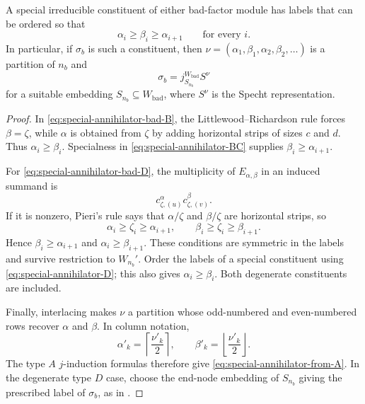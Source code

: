 \begin{lem}\label{lem:special-annihilator-interlacing}
A special irreducible constituent of either bad-factor module has
labels that can be ordered so that
\begin{equation}\label{eq:special-annihilator-strong}
  \alpha_i\geq\beta_i\geq\alpha_{i+1}\qquad\text{for every }i.
\end{equation}
In particular, if $\sigma_b$ is such a constituent, then
$\nu=(\alpha_1,\beta_1,\alpha_2,\beta_2,\ldots)$ is a partition of
$n_b$ and
\begin{equation}\label{eq:special-annihilator-from-A}
  \sigma_b=j_{S_{n_b}}^{W_{\mathrm{bad}}}S^\nu
\end{equation}
for a suitable embedding $S_{n_b}\subseteq W_{\mathrm{bad}}$,
where $S^\nu$ is the Specht representation.
\end{lem}

\begin{proof}
In \eqref{eq:special-annihilator-bad-B}, the Littlewood--Richardson rule
forces $\beta=\zeta$, while $\alpha$ is obtained from $\zeta$ by adding
horizontal strips of sizes $c$ and $d$. Thus $\alpha_i\geq\beta_i$.
Specialness in \eqref{eq:special-annihilator-BC} supplies
$\beta_i\geq\alpha_{i+1}$.

For \eqref{eq:special-annihilator-bad-D}, the multiplicity of
$E_{\alpha,\beta}$ in an induced summand is
\[
  c_{\zeta,(u)}^\alpha c_{\zeta,(v)}^\beta.
\]
If it is nonzero, Pieri's rule says that $\alpha/\zeta$ and
$\beta/\zeta$ are horizontal strips, so
\[
  \alpha_i\geq\zeta_i\geq\alpha_{i+1},\qquad
  \beta_i\geq\zeta_i\geq\beta_{i+1}.
\]
Hence $\beta_i\geq\alpha_{i+1}$ and $\alpha_i\geq\beta_{i+1}$.
These conditions are symmetric in the labels and survive restriction
to $W_{n_b}'$. Order the labels of a special constituent using
\eqref{eq:special-annihilator-D}; this also gives
$\alpha_i\geq\beta_i$. Both degenerate constituents are included.

Finally, interlacing makes $\nu$ a partition whose odd-numbered and
even-numbered rows recover $\alpha$ and $\beta$. In column notation,
\[
  \alpha'_k=\left\lceil\frac{\nu'_k}{2}\right\rceil,\qquad
  \beta'_k=\left\lfloor\frac{\nu'_k}{2}\right\rfloor.
\]
The type $A$ $j$-induction formulas
\cite[Lem.~3.4(3) and Prop.~3.6(4)]{BMW2024} therefore give
\eqref{eq:special-annihilator-from-A}. In the degenerate type $D$
case, choose the end-node embedding of $S_{n_b}$ giving the prescribed
label of $\sigma_b$, as in \cite[(3.4)]{BMW2024}.
\end{proof}

